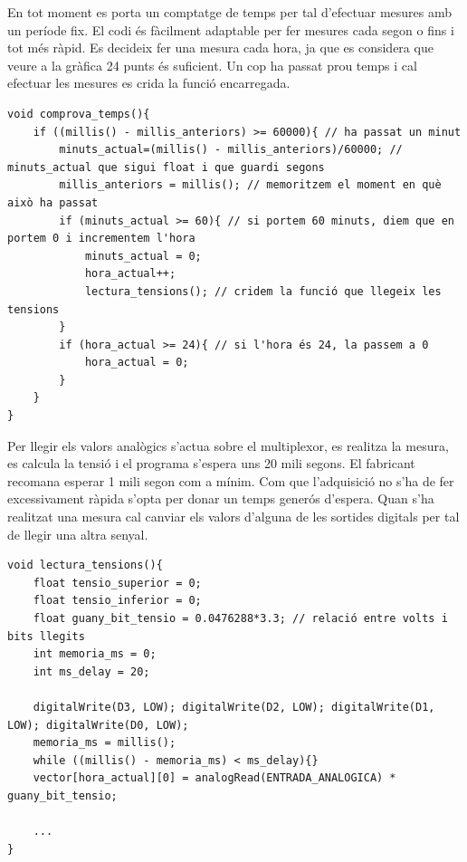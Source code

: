 \begin{spacing}{1.5}

\noindent En tot moment es porta un comptatge de temps per tal d'efectuar mesures amb un període fix. El codi és fàcilment adaptable per fer mesures cada segon o fins i tot més ràpid. Es decideix fer una mesura cada hora, ja que es considera que veure a la gràfica 24 punts és suficient. Un cop ha passat prou temps i cal efectuar les mesures es crida la funció encarregada.
\end{spacing}
\begin{spacing}{1}
\begin{lstlisting}[style=myArduino]
void comprova_temps(){
    if ((millis() - millis_anteriors) >= 60000){ // ha passat un minut
        minuts_actual=(millis() - millis_anteriors)/60000; // minuts_actual que sigui float i que guardi segons
        millis_anteriors = millis(); // memoritzem el moment en què això ha passat
        if (minuts_actual >= 60){ // si portem 60 minuts, diem que en portem 0 i incrementem l'hora
            minuts_actual = 0;
            hora_actual++;
            lectura_tensions(); // cridem la funció que llegeix les tensions
        }
        if (hora_actual >= 24){ // si l'hora és 24, la passem a 0
            hora_actual = 0;  
        }
    }
}
\end{lstlisting}

\end{spacing}
\begin{spacing}{1.5}
\noindent Per llegir els valors analògics s'actua sobre el multiplexor, es realitza la mesura, es calcula la tensió i el programa s'espera uns 20 mili segons. El fabricant recomana esperar 1 mili segon com a mínim. Com que l'adquisició no s'ha de fer excessivament ràpida s'opta per donar un temps generós d'espera. Quan s'ha realitzat una mesura cal canviar els valors d'alguna de les sortides digitals per tal de llegir una altra senyal.

\end{spacing}
\begin{spacing}{1}
\begin{lstlisting}[style=myArduino]
void lectura_tensions(){
    float tensio_superior = 0;
    float tensio_inferior = 0;
    float guany_bit_tensio = 0.0476288*3.3; // relació entre volts i bits llegits
    int memoria_ms = 0;
    int ms_delay = 20;
    
    digitalWrite(D3, LOW); digitalWrite(D2, LOW); digitalWrite(D1, LOW); digitalWrite(D0, LOW);
    memoria_ms = millis();
    while ((millis() - memoria_ms) < ms_delay){}
    vector[hora_actual][0] = analogRead(ENTRADA_ANALOGICA) * guany_bit_tensio;

	...
}
\end{lstlisting}
\end{spacing}
